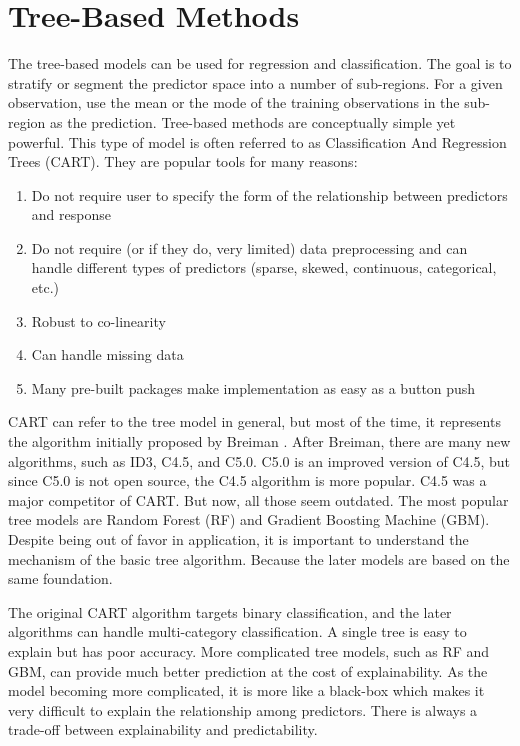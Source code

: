 \documentclass[12pt,]{krantz}
\providecommand{\tightlist}{%
  \setlength{\itemsep}{0pt}\setlength{\parskip}{0pt}}
\begin{document}
\hypertarget{tree-based-methods}{%
\chapter{Tree-Based Methods}\label{tree-based-methods}}

The tree-based models can be used for regression and classification. The goal is to stratify or segment the predictor space into a number of sub-regions. For a given observation, use the mean or the mode of the training observations in the sub-region as the prediction. Tree-based methods are conceptually simple yet powerful. This type of model is often referred to as Classification And Regression Trees (CART). They are popular tools for many reasons:

\begin{enumerate}
\def\labelenumi{\arabic{enumi}.}
\tightlist
\item
  Do not require user to specify the form of the relationship between predictors and response
\item
  Do not require (or if they do, very limited) data preprocessing and can handle different types of predictors (sparse, skewed, continuous, categorical, etc.)
\item
  Robust to co-linearity
\item
  Can handle missing data
\item
  Many pre-built packages make implementation as easy as a button push
\end{enumerate}

CART can refer to the tree model in general, but most of the time, it represents the algorithm initially proposed by Breiman \citep{Breiman1984}. After Breiman, there are many new algorithms, such as ID3, C4.5, and C5.0. C5.0 is an improved version of C4.5, but since C5.0 is not open source, the C4.5 algorithm is more popular. C4.5 was a major competitor of CART. But now, all those seem outdated. The most popular tree models are Random Forest (RF) and Gradient Boosting Machine (GBM). Despite being out of favor in application, it is important to understand the mechanism of the basic tree algorithm. Because the later models are based on the same foundation.

The original CART algorithm targets binary classification, and the later algorithms can handle multi-category classification. A single tree is easy to explain but has poor accuracy. More complicated tree models, such as RF and GBM, can provide much better prediction at the cost of explainability. As the model becoming more complicated, it is more like a black-box which makes it very difficult to explain the relationship among predictors. There is always a trade-off between explainability and predictability.
\end{document}
